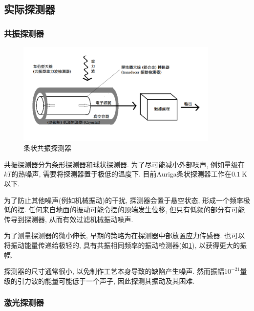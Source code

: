 \documentclass[hidelinks]{ctexart}
\begin{document}


\subsection{实际探测器} %
\label{sub:实际探测器}

\subsubsection{共振探测器} %
\label{ssub:共振探测器}

\begin{figure}[ht]
    \centering
    \includegraphics[width=10cm]{src/Weber_Bar.png}
    \caption{条状共振探测器}
    \label{fig:条状共振探测器}
\end{figure}

共振探测器分为条形探测器和球状探测器. 为了尽可能减小外部噪声, 例如量级在$kT$的热噪声, 需要将探测器置于极低的温度下. 目前Auriga条状探测器工作在$\SI{0.1}{\kelvin}$以下.
\par
为了防止其他噪声(例如机械振动)的干扰, 探测器会置于悬空状态, 形成一个频率极低的摆. 任何来自地面的振动可能令摆的顶端发生位移, 但只有低频的部分有可能传导到探测器, 从而有效过滤机械振动噪声.
\par
为了测量探测器的微小伸长, 早期的策略为在探测器中部放置应力传感器. 也可以将振动能量传递给极轻的, 具有共振相同频率的振动检测器(如\cref{fig:条状共振探测器}), 以获得更大的振幅.
\par
探测器的尺寸通常很小, 以免制作工艺本身导致的缺陷产生噪声. 然而振幅$10^{-21}$量级的引力波的能量可能低于一个声子, 因此探测其振动及其困难.


\subsubsection{激光探测器} %
\label{ssub:激光探测器}
\end{document}
